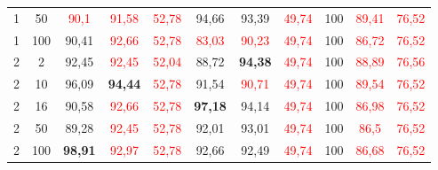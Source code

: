 \begin{table}[ht]
\begin{tabular}{cc|ccc|ccc|ccc}
        {1}                           & {50}    & \textcolor{red}{90,1}               & \textcolor{red}{91,58}              & \textcolor{red}{52,78}                   & {94,66}                         & {93,39}                         & \textcolor{red}{49,74}         & {100}                           & \textcolor{red}{89,41}          & \textcolor{red}{76,52}         \\
        {1}                           & {100}   & {90,41}                             & \textcolor{red}{92,66}              & \textcolor{red}{52,78}                   & \textcolor{red}{83,03}          & \textcolor{red}{90,23}          & \textcolor{red}{49,74}         & {100}                           & \textcolor{red}{86,72}          & \textcolor{red}{76,52}         \\
        {2}                           & {2}     & {92,45}                             & \textcolor{red}{92,45}              & \textcolor{red}{52,04}                   & {88,72}                         & \textbf{94,38}                  & \textcolor{red}{49,74}         & {100}                           & \textcolor{red}{88,89}          & \textcolor{red}{76,56}         \\
        {2}                           & {10}    & {96,09}                             & \textbf{94,44}                      & \textcolor{red}{52,78}                   & {91,54}                         & \textcolor{red}{90,71}          & \textcolor{red}{49,74}         & {100}                           & \textcolor{red}{89,54}          & \textcolor{red}{76,52}         \\
        {2}                           & {16}    & {90,58}                             & \textcolor{red}{92,66}              & \textcolor{red}{52,78}                   & \textbf{97,18}                  & {94,14}                         & \textcolor{red}{49,74}         & {100}                           & \textcolor{red}{86,98}          & \textcolor{red}{76,52}         \\
        {2}                           & {50}    & {89,28}                             & \textcolor{red}{92,45}              & \textcolor{red}{52,78}                   & {92,01}                         & {93,01}                         & \textcolor{red}{49,74}         & {100}                           & \textcolor{red}{86,5}           & \textcolor{red}{76,52}         \\
        {2}                           & {100}   & \textbf{98,91}                      & \textcolor{red}{92,97}              & \textcolor{red}{52,78}                   & {92,66}                         & {92,49}                         & \textcolor{red}{49,74}         & {100}                           & \textcolor{red}{86,68}          & \textcolor{red}{76,52}         \\

\end{tabular}
\end{table}
